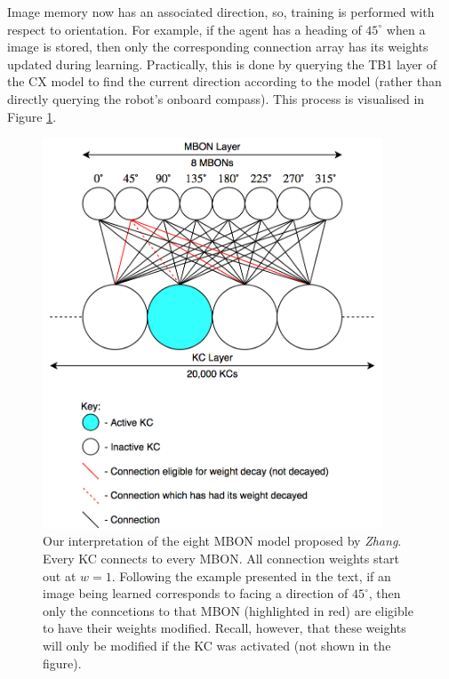 \documentclass[a4paper,11pt,twoside,openright]{article}
\begin{document}
Image memory now has an associated direction, so, training is performed with
respect to orientation. For example, if the agent has a heading of $45^{\circ}$
when a image is stored, then only the corresponding connection array has its
weights updated during learning. Practically, this is done by querying the TB1
layer of the CX model to find the current direction according to the model
(rather than directly querying the robot's onboard compass). This process is
visualised in Figure \ref{fig:eightmbon}.
\newline
\par

\begin{figure}[h!]
  \centering
  \includegraphics[width=0.9\textwidth]{EightENModel}
  \caption{\label{fig:eightmbon} Our interpretation of the eight MBON model
    proposed by \textit{Zhang}. Every KC connects to every MBON. All connection
    weights start out at $w=1$. Following the example presented in the text,
    if an image being learned corresponds to facing a direction of $45^{\circ}$,
    then only the conncetions to that MBON (highlighted in red) are eligible to
    have their weights modified. Recall, however, that these weights will only
    be modified if the KC was activated (not shown in the figure).
    }
\end{figure}
\end{document}
